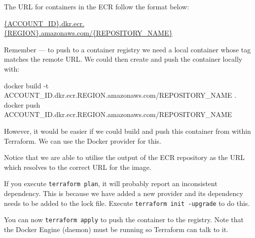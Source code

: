 \documentclass{csse4400}
\begin{document}
\noindent
The URL for containers in the ECR follow the format below:

\url{{ACCOUNT_ID}.dkr.ecr.{REGION}.amazonaws.com/{REPOSITORY_NAME}}

Remember --- to push to a container registry
we need a local container whose tag matches the remote URL.
We could then create and push the container locally with:

\begin{code}[language=bash,numbers=none]{}
docker build -t {ACCOUNT_ID}.dkr.ecr.{REGION}.amazonaws.com/{REPOSITORY_NAME} .
docker push {ACCOUNT_ID}.dkr.ecr.{REGION}.amazonaws.com/{REPOSITORY_NAME} 
\end{code}

However, it would be easier if we could build and push this container from within Terraform.
We can use the Docker provider for this.


Notice that we are able to utilise the output of the ECR repository as the URL which resolves to the correct URL for the image.

If you execute \texttt{terraform plan}, it will probably report an inconsistent dependency.
This is because we have added a new provider and its dependency needs to be added to the lock file.
Execute \texttt{terraform init -upgrade} to do this.

You can now \texttt{terraform apply} to push the container to the registry.
Note that the Docker Engine (daemon) must be running so Terraform can talk to it.






\end{document}
